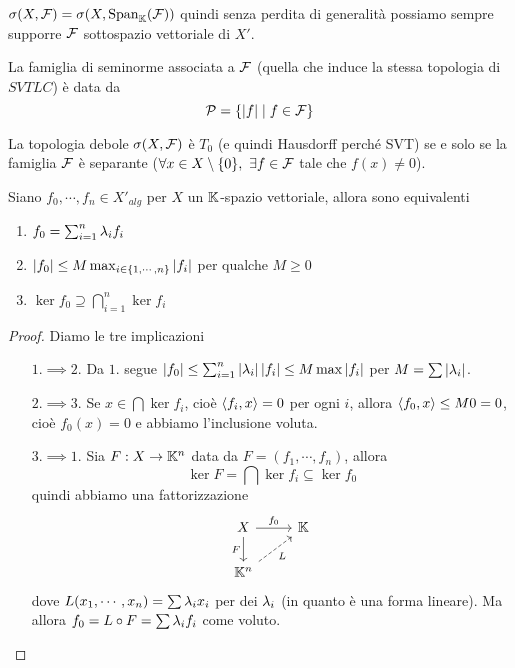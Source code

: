 \begin{remark}
$\sigma(X,\mathcal{F})=\sigma(X,\operatorname{Span}_{\mathbb{K}}(\mathcal{F}))$ quindi senza perdita di generalit\`a possiamo sempre supporre $\mathcal{F}$ sottospazio vettoriale di $X'$.
\end{remark}

\begin{remark}
La famiglia di seminorme associata a $\mathcal{F}$ (quella che induce la stessa topologia di $SVTLC$) \`e data da
\[\mathcal{P}=\left\{{\left|{f}\right|\mid f\in\mathcal{F}}\right\}\]
\end{remark}

\begin{remark}
La topologia debole $\sigma(X,\mathcal{F})$ \`e $T_0$ (e quindi Hausdorff perch\'e SVT) se e solo se la famiglia $\mathcal{F}$ \`e separante ($\forall x\in X\setminus\{0\},\ \exists f\in\mathcal{F}$ tale che $f(x)\neq0$).
\end{remark}


\begin{lemma}[]\label{LmDualeAlgebricoIndipendenzaEContinuita}
Siano $f_0,\cdots,f_n\in X'_{alg}$ per $X$ un $\mathbb{K}$-spazio vettoriale, allora sono equivalenti
\begin{enumerate}
    \item $f_0=\sum_{i=1}^n\lambda_if_i$
    \item $\left|{f_0}\right|\leq M\max_{i\in\left\{{1,\cdots, n}\right\}}\left|{f_i}\right|$ per qualche $M\geq 0$
    \item $\ker f_0\supseteq \bigcap_{i=1}^n\ker f_i$
\end{enumerate}
\end{lemma}
\begin{proof}
    Diamo le tre implicazioni
    \setlength{\leftmargini}{0cm}
    \begin{itemize}
    \item[$\boxed{1.\implies2.}$] Da $1.$ segue $\left|{f_0}\right|\leq\sum_{i=1}^n\left|{\lambda_i}\right|\left|{f_i}\right|\leq M\max\left|{f_i}\right|$ per $M=\sum\left|{\lambda_i}\right|$.
    \item[$\boxed{2.\implies3.}$] Se $x\in \bigcap\ker f_i$, cio\`e $\left\langle {f_i,x}\right\rangle=0$ per ogni $i$, allora $\left\langle {f_0,x}\right\rangle\leq M0=0$, cio\`e $f_0(x)=0$ e abbiamo l'inclusione voluta.
    \item[$\boxed{3.\implies1.}$] Sia $F:X\to\mathbb{K}^n$ data da $F=(f_1,\cdots, f_n)$, allora
    \[\ker F=\bigcap\ker f_i\subseteq \ker f_0\]
    quindi abbiamo una fattorizzazione
\[\begin{tikzcd}
	X & \K \\
	{\K^n}
	\arrow["{f_0}", from=1-1, to=1-2]
	\arrow["F"', from=1-1, to=2-1]
	\arrow["L"', dashed, from=2-1, to=1-2]
\end{tikzcd}\]
    dove $L(x_1,\cdots, x_n)=\sum \lambda_i x_i$ per dei $\lambda_i$ (in quanto \`e una forma lineare). Ma allora $f_0=L\circ F=\sum \lambda_i f_i$ come voluto.
    \end{itemize}
    \setlength{\leftmargini}{0.5cm}
\end{proof}

